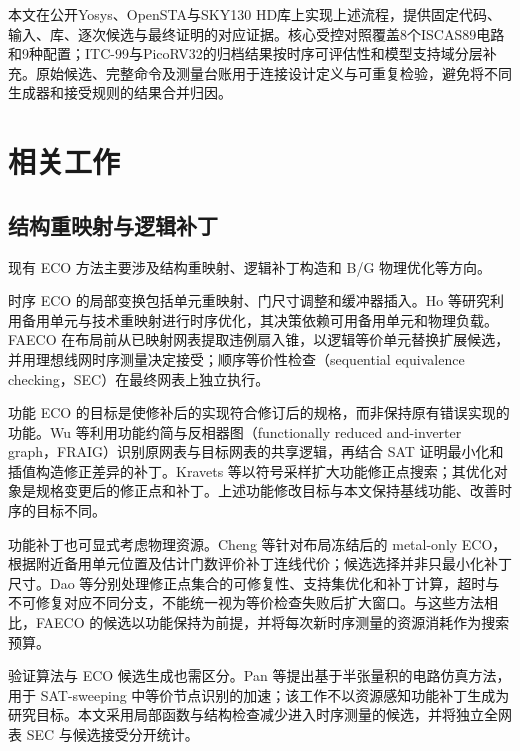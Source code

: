\documentclass[twocolumn,10pt,fontset=windows]{ctexart}
\begin{document}
本文在公开Yosys、OpenSTA与SKY130 HD库上实现上述流程，提供固定代码、输入、库、逐次候选与最终证明的对应证据。核心受控对照覆盖8个ISCAS89电路和9种配置；ITC-99与PicoRV32的归档结果按时序可评估性和模型支持域分层补充。原始候选、完整命令及测量台账用于连接设计定义与可重复检验，避免将不同生成器和接受规则的结果合并归因。

\section{相关工作}

\subsection{结构重映射与逻辑补丁}
现有 ECO 方法主要涉及结构重映射、逻辑补丁构造和 B/G 物理优化等方向。

时序 ECO 的局部变换包括单元重映射、门尺寸调整和缓冲器插入。Ho 等\cite{ho2010eco}研究利用备用单元与技术重映射进行时序优化，其决策依赖可用备用单元和物理负载。FAECO 在布局前从已映射网表提取违例扇入锥，以逻辑等价单元替换扩展候选，并用理想线网时序测量决定接受；顺序等价性检查（sequential equivalence checking，SEC）在最终网表上独立执行。

功能 ECO 的目标是使修补后的实现符合修订后的规格，而非保持原有错误实现的功能。Wu 等\cite{jiang2010fraig}利用功能约简与反相器图（functionally reduced and-inverter graph，FRAIG）识别原网表与目标网表的共享逻辑，再结合 SAT 证明最小化和插值构造修正差异的补丁。Kravets 等\cite{kravets2019symbolic}以符号采样扩大功能修正点搜索；其优化对象是规格变更后的修正点和补丁。上述功能修改目标与本文保持基线功能、改善时序的目标不同。

功能补丁也可显式考虑物理资源。Cheng 等\cite{jiang2016resource}针对布局冻结后的 metal-only ECO，根据附近备用单元位置及估计门数评价补丁连线代价；候选选择并非只最小化补丁尺寸。Dao 等\cite{zhuo2018patch}分别处理修正点集合的可修复性、支持集优化和补丁计算，超时与不可修复对应不同分支，不能统一视为等价检查失败后扩大窗口。与这些方法相比，FAECO 的候选以功能保持为前提，并将每次新时序测量的资源消耗作为搜索预算。

验证算法与 ECO 候选生成也需区分。Pan 等\cite{zhong2024stp}提出基于半张量积的电路仿真方法，用于 SAT-sweeping 中等价节点识别的加速；该工作不以资源感知功能补丁生成为研究目标。本文采用局部函数与结构检查减少进入时序测量的候选，并将独立全网表 SEC 与候选接受分开统计。
\end{document}
